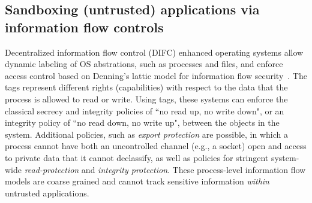 





%

\subsection{Sandboxing (untrusted) applications via information flow controls}

Decentralized information flow control (DIFC) enhanced operating systems allow
dynamic labeling of OS abstrations, such as processes and files, and enforce
access control based on Denning's lattic model for information flow
security~\cite{}.
%
The tags represent different rights (capabilities) with respect to the data
that the process is allowed to read or write.
%
Using tags, these systems can enforce the classical secrecy and integrity policies of
``no read up, no write down", or an integrity policy of ``no read down, no
write up", between the objects in the system.
%
Additional policies, such as \emph{export protection} are possible, in which a
process cannot have both an uncontrolled channel (e.g., a socket) open and
access to private data that it cannot declassify, as well as
policies for stringent system-wide \emph{read-protection} and \emph{integrity
protection}.
%
These process-level information flow models are coarse grained and cannot track
sensitive information \emph{within} untrusted applications.


